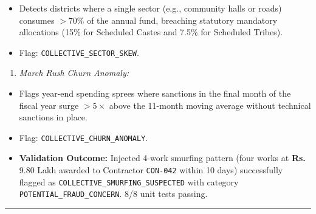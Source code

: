 \documentclass[11pt,a4paper]{article}
\DeclareRobustCommand{\INR}{\textbf{Rs.\,}}
\DeclareRobustCommand{\INR}{₹}
\begin{document}
\begin{itemize}[leftmargin=1.5em, itemsep=2pt, topsep=3pt]
\item Detects districts where a single sector (e.g., community halls or roads) consumes $> 70\%$ of the annual fund, breaching statutory mandatory allocations (15\% for Scheduled Castes and 7.5\% for Scheduled Tribes).
\item Flag: \texttt{COLLECTIVE\_SECTOR\_SKEW}.
\end{itemize}
\begin{enumerate}[leftmargin=1.5em, itemsep=2pt, topsep=3pt]
\item \textit{March Rush Churn Anomaly:}
\end{enumerate}
\begin{itemize}[leftmargin=1.5em, itemsep=2pt, topsep=3pt]
\item Flags year-end spending sprees where sanctions in the final month of the fiscal year surge $> 5\times$ above the 11-month moving average without technical sanctions in place.
\item Flag: \texttt{COLLECTIVE\_CHURN\_ANOMALY}.
\item \textbf{Validation Outcome:} Injected 4-work smurfing pattern (four works at \INR{}9.80 Lakh awarded to Contractor \texttt{CON-042} within 10 days) successfully flagged as \texttt{COLLECTIVE\_SMURFING\_SUSPECTED} with category \texttt{POTENTIAL\_FRAUD\_CONCERN}. 8/8 unit tests passing.
\end{itemize}

\vspace{1em}\hrule\vspace{1em}
\end{document}
